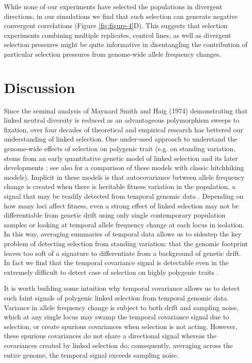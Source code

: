 \documentclass[9pt,twocolumn,twoside]{pnas-new}
\begin{document}
While none of our experiments have selected the populations in divergent
directions, in our simulations we find that such selection can generate
negative convergent correlations (Figure \ref{fig:figure-4}D). This suggests
that selection experiments combining multiple replicates, control lines, as
well as divergent selection pressures might be quite informative in
disentangling the contribution of particular selection pressures from
genome-wide allele frequency changes.

\section*{Discussion}

Since the seminal analysis of Maynard Smith and Haig (1974) demonstrating that
linked neutral diversity is reduced as an advantageous polymorphism sweeps to
fixation, over four decades of theoretical and empirical research has bettered
our understanding of linked selection.  One under-used approach to understand
the genome-wide effects of selection on polygenic trait (e.g.  on standing
variation, stems from an early quantitative genetic model of linked selection
\cite{Robertson1961-ho} and its later developments
\cite{Santiago1995-hx,Santiago1998-bs,Wray1990-zf,Woolliams1993-qo}; see also
\cite{Barton2000-zg} for a comparison of these models with classic hitchhiking
models). Implicit in these models is that autocovariance between allele
frequency change is created when there is heritable fitness variation in the
population, a signal that may be readily detected from temporal genomic data
\cite{Buffalo2019-io}.  Depending on how many loci affect fitness, even a
strong effect of linked selection may not be differentiable from genetic drift
using only single contemporary population samples or looking at temporal allele
frequency change at each locus in isolation. In this way, averaging summaries
of temporal data allows us to sidestep the key problem of detecting selection
from standing variation: that the genomic footprint leaves too soft of a
signature to differentiate from a background of genetic drift. In fact we find
that the temporal covariance signal is detectable even in the extremely
difficult to detect case of selection on highly polygenic traits
\cite{Buffalo2019-io}.

It is worth building some intuition why temporal covariance allows us to detect
such faint signals of polygenic linked selection from temporal genomic data.
Variance in allele frequency change is subject to both drift and
sampling noise, which at any single locus may swamp the temporal
covariance signal due to selection, or create spurious covariances
when selection is not acting.  However, these spurious covariances do not
share a directional signal whereas the covariances created by linked selection
do; consequently, averaging across the entire genome, the temporal signal
exceeds sampling noise. 
\end{document}
